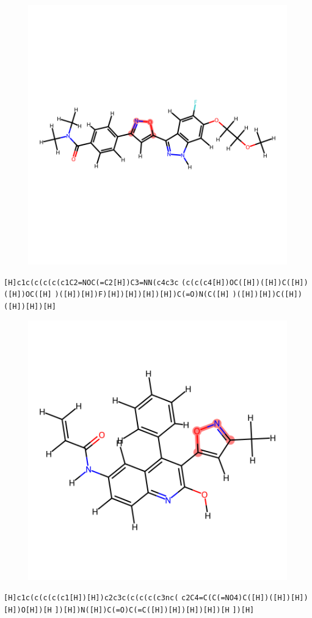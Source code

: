 \documentclass{article}
\begin{document}
\begin{figure}[ht]
\centering
    \includegraphics{mol190.png}
\end{figure}
\verb|[H]c1c(c(c(c(c1C2=NOC(=C2[H])C3=NN(c4c3c| \verb|(c(c(c4[H])OC([H])([H])C([H])([H])OC([H]| \verb|)([H])[H])F)[H])[H])[H])[H])C(=O)N(C([H]| \verb|)([H])[H])C([H])([H])[H])[H]|

\begin{figure}[ht]
\centering
    \includegraphics{mol191.png}
\end{figure}
\verb|[H]c1c(c(c(c(c1[H])[H])c2c3c(c(c(c(c3nc(| \verb|c2C4=C(C(=NO4)C([H])([H])[H])[H])O[H])[H| \verb|])[H])N([H])C(=O)C(=C([H])[H])[H])[H])[H| \verb|])[H]|
\end{document}
